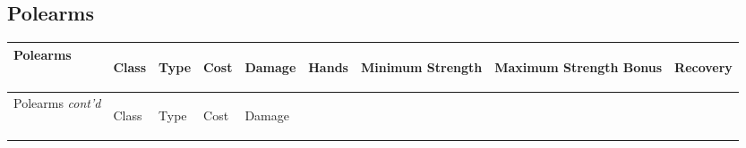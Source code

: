 \documentclass[twoside]{book}
\begin{document}
    

\subsection{Polearms}
    
\begin{longtable}{p{1.25in}llllp{2em}p{3em}p{3em}l} 
  Polearms
  &
  \begin{turn}{70}{Class}\end{turn}
          
  &
  \begin{turn}{70}{Type}\end{turn}
          
  &
  \begin{turn}{70}{Cost}\end{turn}
          
  &
  \begin{turn}{70}{Damage}\end{turn}
          
  &
  \begin{turn}{70}{Hands}\end{turn}
          
  &
  \begin{turn}{70}{Minimum Strength}\end{turn}
          
  &
  \begin{turn}{70}{Maximum Strength Bonus}\end{turn}
          
  &
  \begin{turn}{70}{Recovery}\end{turn}
          
  \\
  \hline
  \hline
  \endfirsthead
  Polearms \textit{cont'd}
        
  &
  \begin{turn}{70}{Class}\end{turn}
          
  &
  \begin{turn}{70}{Type}\end{turn}
          
  &
  \begin{turn}{70}{Cost}\end{turn}
          
  &
  \begin{turn}{70}{Damage}\end{turn}
          

\end{longtable}
\end{document}
